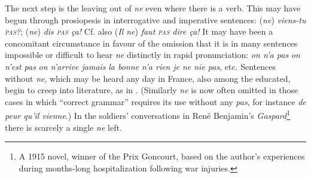 The next step is the leaving out of \textit{ne} even where there is a verb. This may have begun through prosiopesis in interrogative and imperative sentences: (\textit{ne}) \textit{viens-tu \textsc{pas}?}; (\textit{ne}) \textit{dis \textsc{pas} ça!} Cf. also (\textit{Il ne}) \textit{faut \textsc{pas} dire ça!} It may have been a concomitant circumstance in favour of the omission that it is in many sentences impossible or difficult to hear \textit{ne} distinctly in rapid pronunciation: \textit{on n'a pas} \texttt{\vert} \textit{on n'est pas} \texttt{\vert} \textit{on n'arrive jamais} \texttt{\vert} \textit{la bonne n'a rien} \texttt{\vert} \textit{je ne nie pas}, etc. Sentences without \textit{ne}, which may be heard any day in France, also among the educated, begin to creep into literature, as in . (Similarly \textit{ne} is now often omitted in those cases in which ``correct grammar'' requires its use without any \textit{pas}, for instance \textit{de peur qu'il vienne}.) In the soldiers' conversations in René Benjamin's \textit{Gaspard}\footnote{A 1915 novel, winner of the Prix Goncourt, based on the author's experiences during months-long hospitalization following war injuries. \eds} there is scarcely a single \textit{ne} left. %

